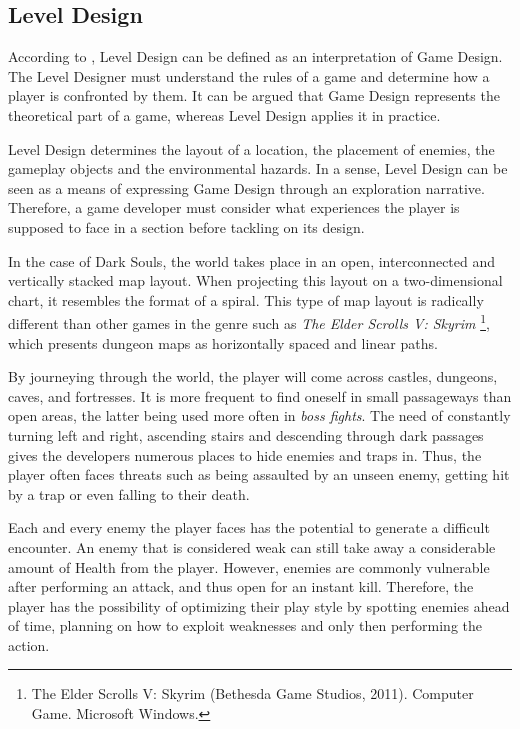 
\subsection{Level Design}

According to \cite{BOOK_LevelDesignConcept}, Level Design can be defined as an interpretation of Game Design. The Level Designer must understand the rules of a game and determine how a player is confronted by them. It can be argued that Game Design represents the theoretical part of a game, whereas Level Design applies it in practice.

Level Design determines the layout of a location, the placement of enemies, the gameplay objects and the environmental hazards. In a sense, Level Design can be seen as a means of expressing Game Design through an exploration narrative. Therefore, a game developer must consider what experiences the player is supposed to face in a section before tackling on its design.

In the case of Dark Souls, the world takes place in an open, interconnected and vertically stacked map layout. When projecting this layout on a two-dimensional chart, it resembles the format of a spiral. This type of map layout is radically different than other games in the genre such as \emph{The Elder Scrolls V: Skyrim} \footnote{The Elder Scrolls V: Skyrim (Bethesda Game Studios, 2011). Computer Game. Microsoft Windows.}, which presents  dungeon maps as horizontally spaced and linear paths.

By journeying through the world, the player will come across castles, dungeons, caves, and fortresses. It is more frequent to find oneself in small passageways than open areas, the latter being used more often in \emph{boss fights}. The need of constantly turning left and right, ascending stairs and descending through dark passages gives the developers numerous places to hide enemies and traps in. Thus, the player often faces threats such as being assaulted by an unseen enemy, getting hit by a trap or even falling to their death.

Each and every enemy the player faces has the potential to generate a difficult encounter. An enemy that is considered weak can still take away a considerable amount of Health from the player. However, enemies are commonly vulnerable after performing an attack, and thus open for an instant kill. Therefore, the player has the possibility of optimizing their play style by spotting enemies ahead of time, planning on how to exploit weaknesses and only then performing the action.

